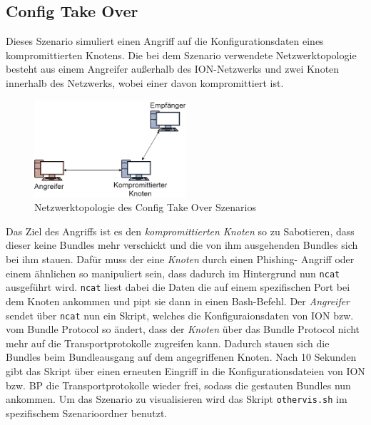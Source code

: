 \documentclass{article}
\begin{document}
\subsection{Config Take Over}
Dieses Szenario simuliert einen Angriff auf die Konfigurationsdaten eines kompromittierten Knotens. Die bei dem Szenario verwendete Netzwerktopologie besteht aus einem Angreifer außerhalb des ION-Netzwerks und zwei Knoten innerhalb des Netzwerks, wobei einer davon kompromittiert ist.
\par
\begin{figure}[h]
\centering
\includegraphics[width=0.5\textwidth]{cto}
\caption{Netzwerktopologie des Config Take Over Szenarios}
\end{figure}
Das Ziel des Angriffs ist es den \textit{kompromittierten Knoten} so zu Sabotieren, dass dieser keine Bundles mehr verschickt und die von ihm ausgehenden Bundles sich bei ihm stauen.
Dafür muss der eine \textit{Knoten} durch einen Phishing- Angriff oder einem ähnlichen so manipuliert sein, dass dadurch im Hintergrund nun \texttt{ncat} ausgeführt wird. \texttt{ncat} liest dabei die Daten die auf einem spezifischen Port bei dem Knoten ankommen und pipt sie dann in einen Bash-Befehl.
Der \textit{Angreifer} sendet über \texttt{ncat} nun ein Skript, welches die Konfiguraionsdaten von ION bzw. vom Bundle Protocol so ändert, dass der \textit{Knoten} über das Bundle Protocol nicht mehr auf die Transportprotokolle zugreifen kann. Dadurch stauen sich die Bundles beim Bundleausgang auf dem angegriffenen Knoten.
Nach 10 Sekunden gibt das Skript über einen erneuten Eingriff in die Konfigurationsdateien von ION bzw. BP die Transportprotokolle wieder frei, sodass die gestauten Bundles nun ankommen.
Um das Szenario zu visualisieren wird das Skript \texttt{othervis.sh} im spezifischem Szenarioordner benutzt.
\end{document}
